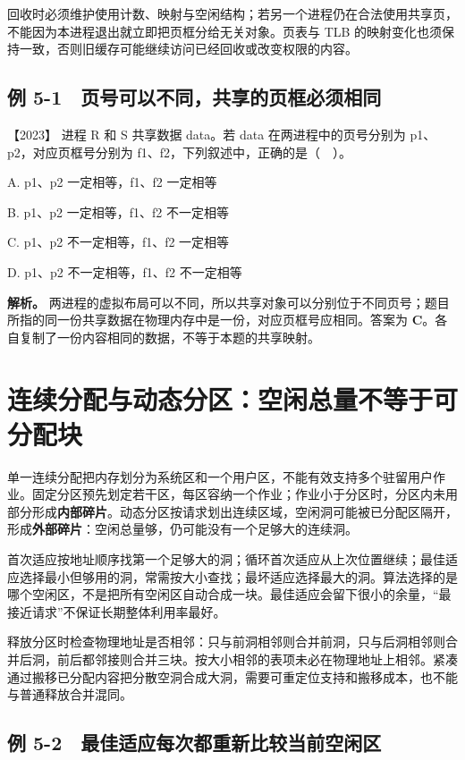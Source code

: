 回收时必须维护使用计数、映射与空闲结构；若另一个进程仍在合法使用共享页，不能因为本进程退出就立即把页框分给无关对象。页表与 TLB 的映射变化也须保持一致，否则旧缓存可能继续访问已经回收或改变权限的内容。

\subsection{例 5-1　页号可以不同，共享的页框必须相同}\label{os-ex5-1}

\noindent{}【2023】 进程 R 和 S 共享数据 data。若 data 在两进程中的页号分别为 p1、p2，对应页框号分别为 f1、f2，下列叙述中，正确的是（　）。

A. p1、p2 一定相等，f1、f2 一定相等

B. p1、p2 一定相等，f1、f2 不一定相等

C. p1、p2 不一定相等，f1、f2 一定相等

D. p1、p2 不一定相等，f1、f2 不一定相等


\textbf{解析。} 两进程的虚拟布局可以不同，所以共享对象可以分别位于不同页号；题目所指的同一份共享数据在物理内存中是一份，对应页框号应相同。答案为 \textbf{C}。各自复制了一份内容相同的数据，不等于本题的共享映射。

\section{连续分配与动态分区：空闲总量不等于可分配块}\label{os-5-3}

单一连续分配把内存划分为系统区和一个用户区，不能有效支持多个驻留用户作业。固定分区预先划定若干区，每区容纳一个作业；作业小于分区时，分区内未用部分形成\textbf{内部碎片}。动态分区按请求划出连续区域，空闲洞可能被已分配区隔开，形成\textbf{外部碎片}：空闲总量够，仍可能没有一个足够大的连续洞。

首次适应按地址顺序找第一个足够大的洞；循环首次适应从上次位置继续；最佳适应选择最小但够用的洞，常需按大小查找；最坏适应选择最大的洞。算法选择的是哪个空闲区，不是把所有空闲区自动合成一块。最佳适应会留下很小的余量，``最接近请求''不保证长期整体利用率最好。

释放分区时检查物理地址是否相邻：只与前洞相邻则合并前洞，只与后洞相邻则合并后洞，前后都邻接则合并三块。按大小相邻的表项未必在物理地址上相邻。紧凑通过搬移已分配内容把分散空洞合成大洞，需要可重定位支持和搬移成本，也不能与普通释放合并混同。

\subsection{例 5-2　最佳适应每次都重新比较当前空闲区}\label{os-ex5-2}

